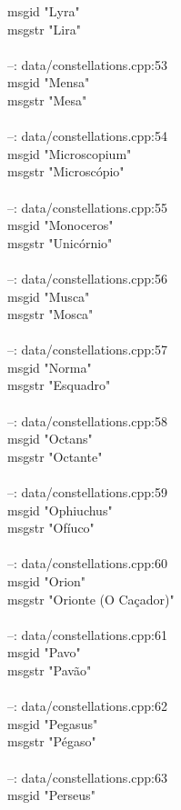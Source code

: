\documentclass[10pt]{article}
\begin{document}
msgid "Lyra"\\
msgstr "Lira"\\
\\
--: data/constellations.cpp:53\\
msgid "Mensa"\\
msgstr "Mesa"\\
\\
--: data/constellations.cpp:54\\
msgid "Microscopium"\\
msgstr "Microscópio"\\
\\
--: data/constellations.cpp:55\\
msgid "Monoceros"\\
msgstr "Unicórnio"\\
\\
--: data/constellations.cpp:56\\
msgid "Musca"\\
msgstr "Mosca"\\
\\
--: data/constellations.cpp:57\\
msgid "Norma"\\
msgstr "Esquadro"\\
\\
--: data/constellations.cpp:58\\
msgid "Octans"\\
msgstr "Octante"\\
\\
--: data/constellations.cpp:59\\
msgid "Ophiuchus"\\
msgstr "Ofíuco"\\
\\
--: data/constellations.cpp:60\\
msgid "Orion"\\
msgstr "Orionte (O Caçador)"\\
\\
--: data/constellations.cpp:61\\
msgid "Pavo"\\
msgstr "Pavão"\\
\\
--: data/constellations.cpp:62\\
msgid "Pegasus"\\
msgstr "Pégaso"\\
\\
--: data/constellations.cpp:63\\
msgid "Perseus"\\
\end{document}
